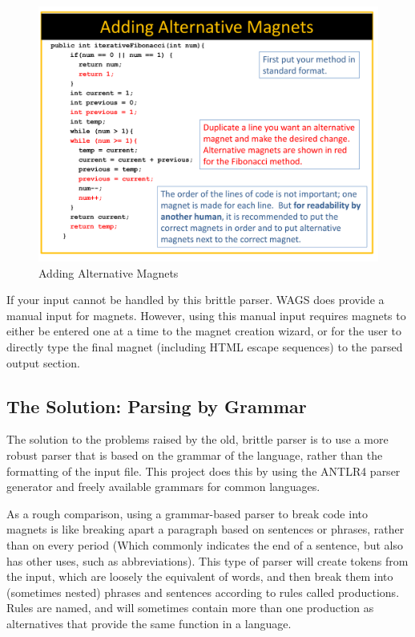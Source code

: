 \documentclass[letter,10pt]{article}
\begin{document}
\begin{figure}
 \centering
 
\includegraphics[width=.8\linewidth,keepaspectratio=true
  ]{./images/CreatingCodeMagnetLab/old_parser_presentation-09.png}
 \caption{Adding Alternative Magnets}
 \label{fig:old_parser_alts}
\end{figure}

If your input cannot be handled by this brittle parser. WAGS does 
provide a manual input for magnets. However, using this manual input 
requires magnets to either be entered one at a time to the magnet 
creation wizard, or for the user to directly type the final magnet 
(including HTML escape sequences) to the parsed output section. 


\subsection{The Solution: Parsing by Grammar}

The solution to the problems raised by the old, brittle parser is to 
use a more robust parser that is based on the grammar of the language, 
rather than the formatting of the input file. This project does this by 
using the ANTLR4 parser generator\cite{antlr-reference} and freely 
available grammars for common languages\cite{antlr-grammars-project}.

As a rough comparison, using a grammar-based parser to 
break code into magnets is like breaking apart a paragraph based on 
sentences or phrases, rather than on every period (Which commonly 
indicates the end of a sentence, but also has other uses, such as 
abbreviations). This type of parser will create tokens from the input, 
which are loosely the equivalent of words, and then break them into 
(sometimes nested) phrases and sentences according to rules called 
productions. Rules are named, and will sometimes contain more than one 
production as alternatives that provide the same function in a 
language. 
\end{document}
